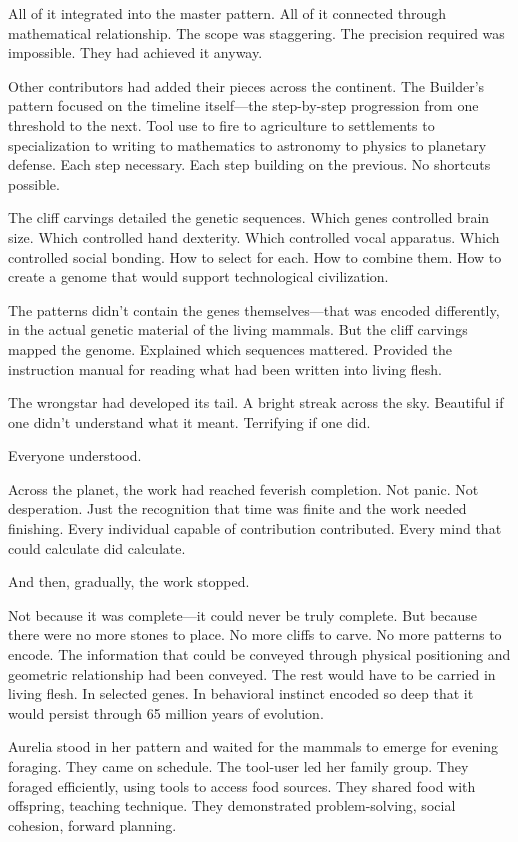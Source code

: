 All of it integrated into the master pattern. All of it connected through mathematical relationship. The scope was staggering. The precision required was impossible. They had achieved it anyway.

Other contributors had added their pieces across the continent. The Builder's pattern focused on the timeline itself—the step-by-step progression from one threshold to the next. Tool use to fire to agriculture to settlements to specialization to writing to mathematics to astronomy to physics to planetary defense. Each step necessary. Each step building on the previous. No shortcuts possible.

The cliff carvings detailed the genetic sequences. Which genes controlled brain size. Which controlled hand dexterity. Which controlled vocal apparatus. Which controlled social bonding. How to select for each. How to combine them. How to create a genome that would support technological civilization.

The patterns didn't contain the genes themselves—that was encoded differently, in the actual genetic material of the living mammals. But the cliff carvings mapped the genome. Explained which sequences mattered. Provided the instruction manual for reading what had been written into living flesh.

\scenebreak

The wrongstar had developed its tail. A bright streak across the sky. Beautiful if one didn't understand what it meant. Terrifying if one did.

Everyone understood.

Across the planet, the work had reached feverish completion. Not panic. Not desperation. Just the recognition that time was finite and the work needed finishing. Every individual capable of contribution contributed. Every mind that could calculate did calculate.

And then, gradually, the work stopped.

Not because it was complete—it could never be truly complete. But because there were no more stones to place. No more cliffs to carve. No more patterns to encode. The information that could be conveyed through physical positioning and geometric relationship had been conveyed. The rest would have to be carried in living flesh. In selected genes. In behavioral instinct encoded so deep that it would persist through 65 million years of evolution.

Aurelia stood in her pattern and waited for the mammals to emerge for evening foraging. They came on schedule. The tool-user led her family group. They foraged efficiently, using tools to access food sources. They shared food with offspring, teaching technique. They demonstrated problem-solving, social cohesion, forward planning.


